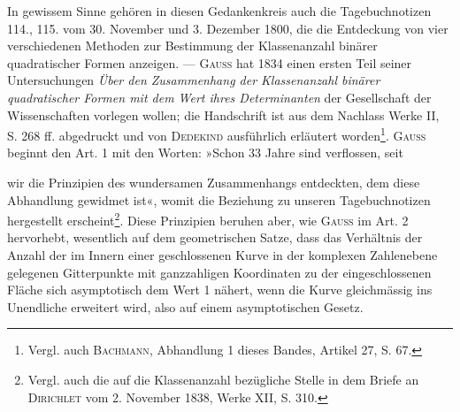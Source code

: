 In gewissem Sinne gehören in diesen Gedankenkreis auch die Tagebuchnotizen
114., 115. vom 30. November und 3. Dezember 1800, die die Entdeckung
von vier verschiedenen Methoden zur Bestimmung der Klassenanzahl
binärer quadratischer Formen anzeigen. — \textsc{Gauss} hat 1834 einen ersten Teil
seiner Untersuchungen \textit{Über den Zusammenhang der Klassenanzahl binärer quadratischer
Formen mit dem Wert ihres Determinanten} der Gesellschaft der Wissenschaften
vorlegen wollen; die Handschrift ist aus dem Nachlass Werke II,
S. 268 ff. abgedruckt und von \textsc{Dedekind} ausführlich erläutert worden\footnote{Vergl. auch \textsc{Bachmann}, Abhandlung 1 dieses Bandes, Artikel 27, S. 67.}. \textsc{Gauss}
beginnt den Art. 1 mit den Worten: »Schon 33 Jahre sind verflossen, seit\par
\clearpage{}
\noindent wir die Prinzipien des wundersamen Zusammenhangs entdeckten, dem diese
Abhandlung gewidmet ist«, womit die Beziehung zu unseren Tagebuchnotizen
hergestellt erscheint\footnote{Vergl. auch die auf die Klassenanzahl bezügliche Stelle in dem Briefe an \textsc{Dirichlet} vom 2. November 1838, Werke XII, S. 310.}. Diese Prinzipien beruhen aber, wie \textsc{Gauss} im Art. 2
hervorhebt, wesentlich auf dem geometrischen Satze, dass das Verhältnis der
Anzahl der im Innern einer geschlossenen Kurve in der komplexen Zahlenebene
gelegenen Gitterpunkte mit ganzzahligen Koordinaten zu der eingeschlossenen
Fläche sich asymptotisch dem Wert 1 nähert, wenn die Kurve
gleichmässig ins Unendliche erweitert wird, also auf einem asymptotischen
Gesetz.
